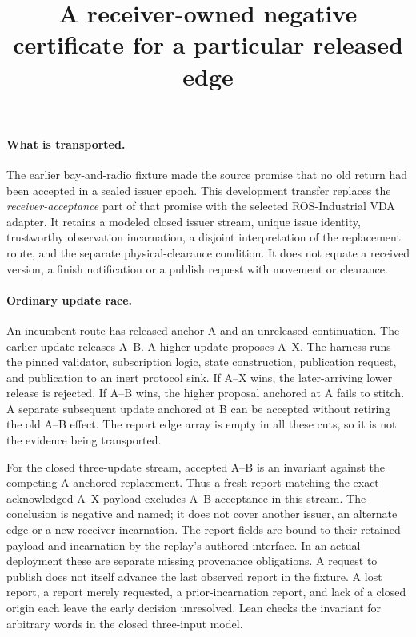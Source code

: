 \documentclass[11pt]{article}
\title{A receiver-owned negative certificate for a particular released edge}
\author{}\date{}
\begin{document}
\maketitle

\paragraph{What is transported.}
The earlier bay-and-radio fixture made the source promise that no
old return had been accepted in a sealed issuer epoch. This development
transfer replaces the \emph{receiver-acceptance} part of that promise
with the selected ROS-Industrial VDA adapter. It retains a modeled
closed issuer stream, unique issue identity, trustworthy observation
incarnation, a disjoint interpretation of the replacement route,
and the separate physical-clearance condition. It does not equate
a received version, a finish notification or a publish request with
movement or clearance.

\paragraph{Ordinary update race.}
An incumbent route has released anchor A and an unreleased continuation.
The earlier update releases A--B. A higher update proposes A--X.
The harness runs the pinned validator, subscription logic, state
construction, publication request, and publication to an inert protocol
sink. If A--X wins, the later-arriving lower release is rejected. If
A--B wins, the higher proposal anchored at A fails to stitch. A separate
subsequent update anchored at B can be accepted without retiring the old
A--B effect. The report edge array is empty in all these cuts, so it is
not the evidence being transported.

For the closed three-update stream, accepted A--B is an invariant
against the competing A-anchored replacement. Thus a fresh report
matching the exact acknowledged A--X payload excludes A--B acceptance
in this stream. The conclusion is negative and named; it does not
cover another issuer, an alternate edge or a new receiver incarnation.
The report fields are bound to their retained payload and incarnation
by the replay's authored interface. In an actual deployment these are
separate missing provenance obligations. A request to publish does not
itself advance the last observed report in the fixture. A lost report,
a report merely requested, a prior-incarnation report, and lack of
a closed origin each leave the early decision unresolved. Lean checks
the invariant for arbitrary words in the closed three-input model.
\end{document}

